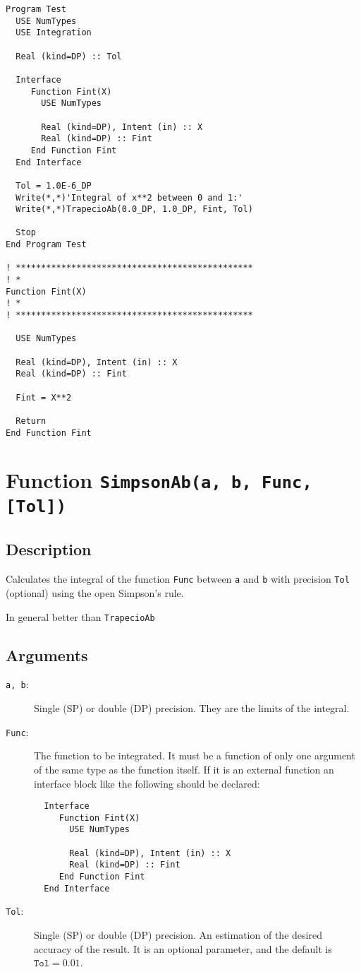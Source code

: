 \begin{verbatim}
Program Test
  USE NumTypes
  USE Integration

  Real (kind=DP) :: Tol

  Interface 
     Function Fint(X)
       USE NumTypes

       Real (kind=DP), Intent (in) :: X
       Real (kind=DP) :: Fint
     End Function Fint
  End Interface

  Tol = 1.0E-6_DP
  Write(*,*)'Integral of x**2 between 0 and 1:'
  Write(*,*)TrapecioAb(0.0_DP, 1.0_DP, Fint, Tol)

  Stop
End Program Test

! ***********************************************
! *
Function Fint(X)
! *  
! ***********************************************

  USE NumTypes

  Real (kind=DP), Intent (in) :: X
  Real (kind=DP) :: Fint

  Fint = X**2

  Return
End Function Fint
\end{verbatim}


\section{Function \texttt{SimpsonAb(a, b, Func, [Tol])}}

\subsection{Description}

Calculates the integral of the function \texttt{Func} between
\texttt{a} and \texttt{b} with precision \texttt{Tol} (optional) using
the open Simpson's rule.

In general better than \texttt{TrapecioAb}

\subsection{Arguments}

\begin{description}
\item[\texttt{a, b}:] Single (SP) or double (DP) precision. They are
  the limits of the integral.
\item[\texttt{Func}:] The function to be integrated. It must be a
  function of only one argument of the same type as the function
  itself. If it is an
  external function an interface block like the following should be
  declared: 
\begin{verbatim}
  Interface 
     Function Fint(X)
       USE NumTypes

       Real (kind=DP), Intent (in) :: X
       Real (kind=DP) :: Fint
     End Function Fint
  End Interface
\end{verbatim}
\item[\texttt{Tol}:] Single (SP) or double (DP) precision. An
  estimation of the desired accuracy of the result. It is an optional
  parameter, and the default is $\mathtt{Tol} = 0.01$. 
\end{description}


